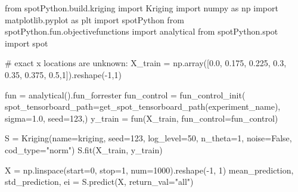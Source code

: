 \documentclass[
  letterpaper,
  DIV=11,
  numbers=noendperiod]{scrreprt}
\newenvironment{Shaded}{\begin{snugshade}}{\end{snugshade}}
\newcommand{\CommentTok}[1]{\textcolor[rgb]{0.37,0.37,0.37}{#1}}
\newcommand{\DecValTok}[1]{\textcolor[rgb]{0.68,0.00,0.00}{#1}}
\newcommand{\FloatTok}[1]{\textcolor[rgb]{0.68,0.00,0.00}{#1}}
\newcommand{\ImportTok}[1]{\textcolor[rgb]{0.00,0.46,0.62}{#1}}
\newcommand{\NormalTok}[1]{\textcolor[rgb]{0.00,0.23,0.31}{#1}}
\newcommand{\OperatorTok}[1]{\textcolor[rgb]{0.37,0.37,0.37}{#1}}
\newcommand{\StringTok}[1]{\textcolor[rgb]{0.13,0.47,0.30}{#1}}
\newcommand{\VariableTok}[1]{\textcolor[rgb]{0.07,0.07,0.07}{#1}}
\begin{document}
\begin{Shaded}
\begin{Highlighting}[]
\ImportTok{from}\NormalTok{ spotPython.build.kriging }\ImportTok{import}\NormalTok{ Kriging}
\ImportTok{import}\NormalTok{ numpy }\ImportTok{as}\NormalTok{ np}
\ImportTok{import}\NormalTok{ matplotlib.pyplot }\ImportTok{as}\NormalTok{ plt}
\ImportTok{import}\NormalTok{ spotPython}
\ImportTok{from}\NormalTok{ spotPython.fun.objectivefunctions }\ImportTok{import}\NormalTok{ analytical}
\ImportTok{from}\NormalTok{ spotPython.spot }\ImportTok{import}\NormalTok{ spot}

\CommentTok{\# exact x locations are unknown:}
\NormalTok{X\_train }\OperatorTok{=}\NormalTok{ np.array([}\FloatTok{0.0}\NormalTok{, }\FloatTok{0.175}\NormalTok{, }\FloatTok{0.225}\NormalTok{, }\FloatTok{0.3}\NormalTok{, }\FloatTok{0.35}\NormalTok{, }\FloatTok{0.375}\NormalTok{, }\FloatTok{0.5}\NormalTok{,}\DecValTok{1}\NormalTok{]).reshape(}\OperatorTok{{-}}\DecValTok{1}\NormalTok{,}\DecValTok{1}\NormalTok{)}

\NormalTok{fun }\OperatorTok{=}\NormalTok{ analytical().fun\_forrester}
\NormalTok{fun\_control }\OperatorTok{=}\NormalTok{ fun\_control\_init(}
\NormalTok{    spot\_tensorboard\_path}\OperatorTok{=}\NormalTok{get\_spot\_tensorboard\_path(experiment\_name),}
\NormalTok{    sigma}\OperatorTok{=}\FloatTok{1.0}\NormalTok{,}
\NormalTok{    seed}\OperatorTok{=}\DecValTok{123}\NormalTok{,)}
\NormalTok{y\_train }\OperatorTok{=}\NormalTok{ fun(X\_train, fun\_control}\OperatorTok{=}\NormalTok{fun\_control)}

\NormalTok{S }\OperatorTok{=}\NormalTok{ Kriging(name}\OperatorTok{=}\StringTok{\textquotesingle{}kriging\textquotesingle{}}\NormalTok{,  seed}\OperatorTok{=}\DecValTok{123}\NormalTok{, log\_level}\OperatorTok{=}\DecValTok{50}\NormalTok{, n\_theta}\OperatorTok{=}\DecValTok{1}\NormalTok{, noise}\OperatorTok{=}\VariableTok{False}\NormalTok{, cod\_type}\OperatorTok{=}\StringTok{"norm"}\NormalTok{)}
\NormalTok{S.fit(X\_train, y\_train)}

\NormalTok{X }\OperatorTok{=}\NormalTok{ np.linspace(start}\OperatorTok{=}\DecValTok{0}\NormalTok{, stop}\OperatorTok{=}\DecValTok{1}\NormalTok{, num}\OperatorTok{=}\DecValTok{1000}\NormalTok{).reshape(}\OperatorTok{{-}}\DecValTok{1}\NormalTok{, }\DecValTok{1}\NormalTok{)}
\NormalTok{mean\_prediction, std\_prediction, ei }\OperatorTok{=}\NormalTok{ S.predict(X, return\_val}\OperatorTok{=}\StringTok{"all"}\NormalTok{)}


\end{Highlighting}
\end{Shaded}
\end{document}
